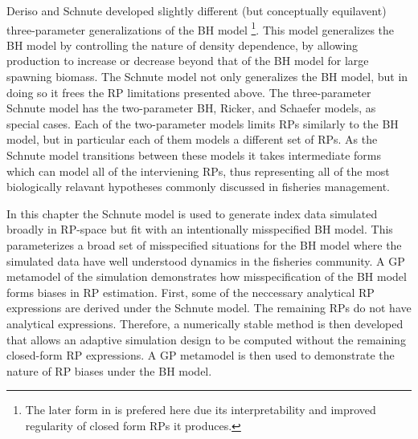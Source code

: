 %
Deriso \cite{deriso_harvesting_1980} and Schnute \cite{schnute_general_1985} 
developed slightly different (but conceptually equilavent) three-parameter 
generalizations of the BH model
\footnote{
The later form in \cite{schnute_general_1985} is prefered here due its 
interpretability and improved regularity of closed form RPs it produces.
}.
This model generalizes the BH model by controlling the nature of density 
dependence, by allowing production to increase or decrease beyond that of the 
BH model for large spawning biomass. 
%
The Schnute model not only generalizes the BH model, but in doing so it 
frees the RP limitations presented above. The three-parameter Schnute model has 
the two-parameter BH, Ricker, and Schaefer models, as special cases. 
Each of the two-parameter models limits RPs similarly to the BH model, but in 
particular each of them models a different set of RPs. 
As the Schnute model transitions between these models it takes intermediate 
forms which can model all of the interviening RPs, thus representing all of 
the most biologically relavant hypotheses commonly discussed in fisheries 
management.  

%
In this chapter the Schnute model is used to generate index data simulated 
broadly in RP-space but fit with an intentionally misspecified BH model. This
parameterizes a broad set of misspecified situations for the BH model
where the simulated data have well understood dynamics in the fisheries
community. A GP metamodel of the simulation demonstrates how misspecification 
of the BH model forms biases in RP estimation. First, some of the neccessary 
analytical RP expressions are derived under the Schnute model. The remaining 
RPs do not have analytical expressions. Therefore, a numerically stable method 
is then developed that allows an adaptive simulation design to be computed 
without the remaining closed-form RP expressions. A GP metamodel is then used 
to demonstrate the nature of RP biases under the BH model. 


